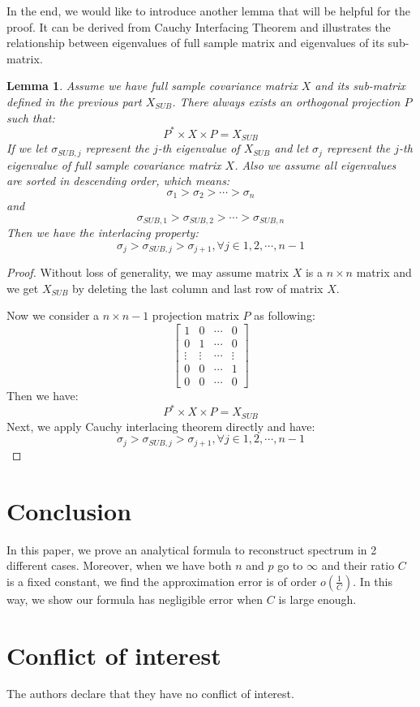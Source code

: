 \documentclass[12pt]{amsart}
\newtheorem{lemma}[theorem]{Lemma}
\theoremstyle{definition}
\numberwithin{equation}{section}
\numberwithin{equation}{section}
\theoremstyle{remark}
\numberwithin{equation}{section}
\begin{document}
In the end, we would like to introduce another lemma that will be helpful for the proof. It can be derived from Cauchy Interfacing Theorem and illustrates the relationship between eigenvalues of full sample matrix and eigenvalues of its sub-matrix.
\begin{lemma}\label{interlacing_lemma}
	Assume we have full sample covariance matrix $X$ and its sub-matrix defined in the previous part $X_{SUB}$. There always exists an orthogonal projection $P$ such that:
	$$ P^*\times X\times P = X_{SUB}$$
	If we let $\sigma_{SUB,j}$ represent the $j$-th eigenvalue of $X_{SUB}$ and let $\sigma_{j}$ represent the $j$-th eigenvalue of full sample covariance matrix $X$.
	Also we assume all eigenvalues are sorted in descending order, which means:
	$$ \sigma_1 > \sigma_2 > \cdots > \sigma_n $$
	and
	$$\sigma_{SUB,1} > \sigma_{SUB,2} > \cdots > \sigma_{SUB,n}$$
	Then we have the interlacing property:
	$$ \sigma_{j} > \sigma_{SUB,j} > \sigma_{j+1}, \forall j \in {1,2,\cdots,n-1}$$
\end{lemma}

\begin{proof}
	Without loss of generality, we may assume matrix $X$ is a $n\times n$ matrix and we get $X_{SUB}$ by deleting the last column and last row of matrix $X$.
	
	Now we consider a $n \times n-1$ projection matrix $P$ as following:
	\begin{equation}
	\left[\begin{array}{ccccccccc}
	1 & 0 & \cdots & 0 \\
	0 & 1 & \cdots & 0 \\
	\vdots & \vdots & \cdots & \vdots\\
	0 & 0 & \cdots & 1\\
	0 & 0 & \cdots & 0
	\end{array}\right]
	\end{equation}
	Then we have:
	$$ P^*\times X\times P = X_{SUB}$$
	Next, we apply Cauchy interlacing theorem directly and have:
	$$ \sigma_{j} > \sigma_{SUB,j} > \sigma_{j+1}, \forall j \in {1,2,\cdots,n-1}$$
\end{proof}

\section{Conclusion}
In this paper, we prove an analytical formula to reconstruct spectrum in 2 different cases. Moreover, when we have both $n$ and $p$ go to $\infty$ and their ratio $C$ is a fixed constant, we find the approximation error is of order $o(\frac{1}{C})$. In this way, we show our formula has negligible error when $C$ is large enough. 


%
\section*{Conflict of interest}
%
The authors declare that they have no conflict of interest.



\end{document}
